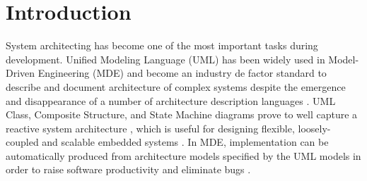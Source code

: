 \section{Introduction}
\label{sec:intro}





System architecting has become one of the most important tasks during development.
Unified Modeling Language (UML) has been widely used in Model-Driven Engineering (MDE) \cite{Selic2012} and become an industry de factor standard to describe and document architecture of complex systems \cite{hilliard1999using, HUTCHINSON2014144} despite the emergence and disappearance of a number of architecture description languages \cite{pandey2010architectural}.
UML Class, Composite Structure, and State Machine diagrams prove to well capture a reactive system architecture \cite{possepapyrusrt}, which is useful for designing flexible, loosely-coupled and scalable embedded systems \cite{Dunkels:2006:PSE:1182807.1182811,reactivemanifesto}.    
In MDE, implementation can be automatically produced from architecture models specified by the UML models in order to raise software productivity and eliminate bugs \cite{possepapyrusrt}.


